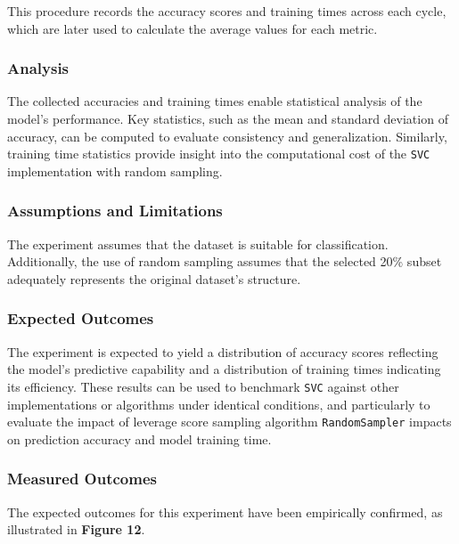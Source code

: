 \documentclass{article}
\theoremstyle{plain}
\theoremstyle{definition}
\theoremstyle{remark}
\begin{document}
This procedure records the accuracy scores and training times across each cycle, which are later used to calculate the average values for each metric.

\subsubsection{Analysis}

The collected accuracies and training times enable statistical analysis of the model's performance. Key statistics, such as the mean and standard deviation of accuracy, can be computed to evaluate consistency and generalization. Similarly, training time statistics provide insight into the computational cost of the \texttt{SVC} implementation with random sampling.

\subsubsection{Assumptions and Limitations}

The experiment assumes that the dataset is suitable for classification. Additionally, the use of random sampling assumes that the selected 20\% subset adequately represents the original dataset's structure.

\subsubsection{Expected Outcomes}

The experiment is expected to yield a distribution of accuracy scores reflecting the model's predictive capability and a distribution of training times indicating its efficiency. These results can be used to benchmark \texttt{SVC} against other implementations or algorithms under identical conditions, and particularly to evaluate the impact of leverage score sampling algorithm \texttt{RandomSampler} impacts on prediction accuracy and model training time.

\subsubsection{Measured Outcomes}

The expected outcomes for this experiment have been empirically confirmed, as illustrated in \textbf{Figure 12}.
\end{document}
